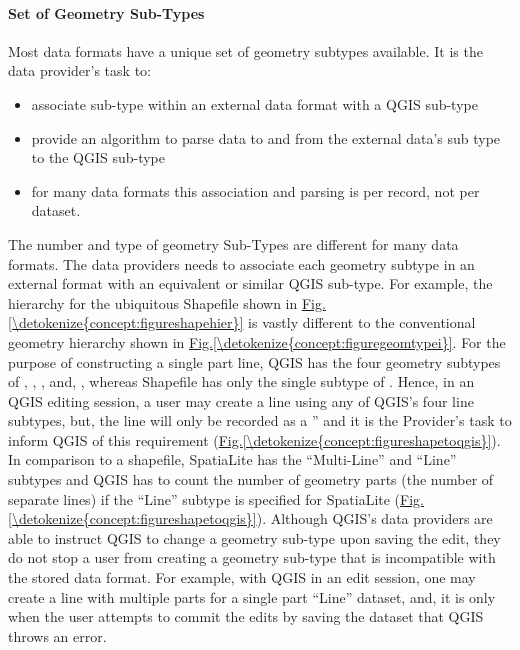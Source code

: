 \documentclass[letterpaper,11pt,english]{sphinxmanual}
\begin{document}
\paragraph{Set of Geometry Sub-Types}
\label{\detokenize{concept:set-of-geometry-sub-types}}
Most data formats have a unique set of geometry subtypes available.  It is the data provider’s task to:
\begin{itemize}
\item {} 
associate sub-type within an external data format with a QGIS sub-type

\item {} 
provide an algorithm to parse data to and from the external data’s sub type to the QGIS sub-type

\item {} 
for many data formats this association and parsing is per record, not per dataset.

\end{itemize}

The number and type of geometry Sub-Types are different for many data formats.  The data providers needs to associate each geometry subtype in an external format with an equivalent or similar QGIS sub-type.  For example, the hierarchy for the ubiquitous Shapefile shown in \hyperref[\detokenize{concept:figureshapehier}]{Fig.\@ \ref{\detokenize{concept:figureshapehier}}} is vastly different to the conventional geometry hierarchy shown in \hyperref[\detokenize{concept:figuregeomtypei}]{Fig.\@ \ref{\detokenize{concept:figuregeomtypei}}}.  For the purpose of constructing a single part line, QGIS has the four geometry subtypes of , , , and, , whereas Shapefile has only the single subtype of .  Hence, in an QGIS editing session, a user may create a line using any of QGIS’s four line subtypes, but, the line will only be recorded as a ” and it is the Provider’s task to inform QGIS of this requirement (\hyperref[\detokenize{concept:figureshapetoqgis}]{Fig.\@ \ref{\detokenize{concept:figureshapetoqgis}}}).  In comparison to a shapefile, SpatiaLite has the “Multi-Line” and “Line” subtypes and QGIS has to count the number of geometry parts (the number of separate lines) if the “Line” subtype is specified for SpatiaLite (\hyperref[\detokenize{concept:figureshapetoqgis}]{Fig.\@ \ref{\detokenize{concept:figureshapetoqgis}}}).  Although QGIS’s data providers are able to instruct QGIS to change a geometry sub-type upon saving the edit, they do not stop a user from creating a geometry sub-type that is incompatible with the stored data format.  For example, with QGIS in an edit session, one may create a line with multiple parts for a single part “Line” dataset, and, it is only when the user attempts to commit the edits by saving the dataset that QGIS throws an error.
\end{document}
